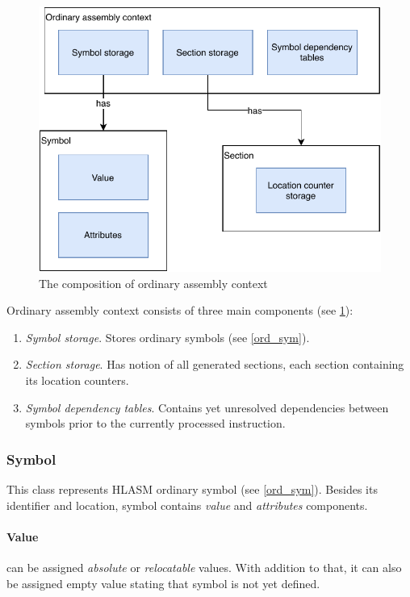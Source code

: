 \begin{figure}
	\centering
	\includegraphics[width=\textwidth]{img/ord_ctx_arch}
	\caption{The composition of ordinary assembly context}
	\label{fig06:ord_ctx}
\end{figure}

Ordinary assembly context consists of three main components (see \cref{fig06:ord_ctx}):
\begin{enumerate}
	\item \emph{Symbol storage}. Stores ordinary symbols (see \cref{ord_sym}).
	\item \emph{Section storage}. Has notion of all generated sections, each section containing its location counters.
	\item \emph{Symbol dependency tables}. Contains yet unresolved dependencies between symbols prior to the currently processed instruction.
\end{enumerate}

\subsubsection{Symbol}

This class represents HLASM ordinary symbol (see \cref{ord_sym}). Besides its identifier and location, symbol contains \emph{value} and \emph{attributes} components.

\paragraph*{Value} can be assigned \emph{absolute} or \emph{relocatable} values. With addition to that, it can also be assigned empty value stating that symbol is not yet defined.

